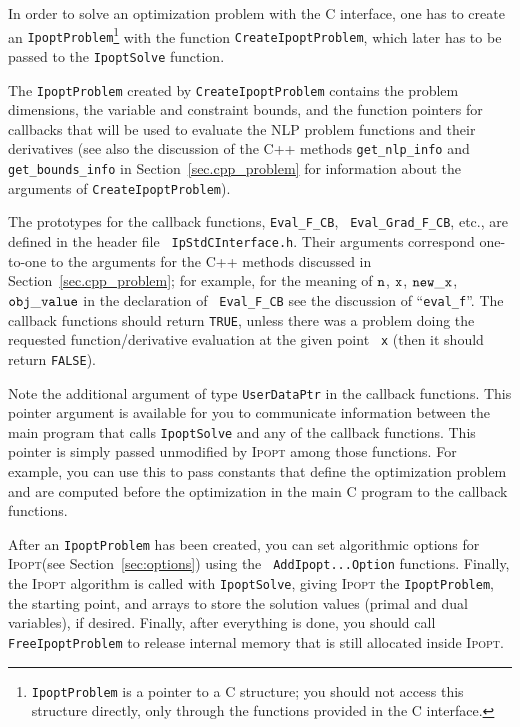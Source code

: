\documentclass[10pt]{article}
\newcommand{\Ipopt}{\textsc{Ipopt}\xspace}
\begin{document}
In order to solve an optimization problem with the C interface, one
has to create an {\tt IpoptProblem}\footnote{{\tt IpoptProblem} is a
  pointer to a C structure; you should not access this structure
  directly, only through the functions provided in the C interface.}
with the function {\tt CreateIpoptProblem}, which later has to be
passed to the {\tt IpoptSolve} function.

The {\tt IpoptProblem} created by {\tt CreateIpoptProblem} contains
the problem dimensions, the variable and constraint bounds, and the
function pointers for callbacks that will be used to evaluate the NLP
problem functions and their derivatives (see also the discussion of
the C++ methods {\tt get\_nlp\_info} and {\tt get\_bounds\_info} in
Section~\ref{sec.cpp_problem} for information about the arguments of
{\tt CreateIpoptProblem}).

The prototypes for the callback functions, {\tt Eval\_F\_CB}, {\tt
  Eval\_Grad\_F\_CB}, etc., are defined in the header file {\tt
  IpStdCInterface.h}.  Their arguments correspond one-to-one to the
arguments for the C++ methods discussed in
Section~\ref{sec.cpp_problem}; for example, for the meaning of $\tt
n$, $\tt x$, $\tt new\_x$, $\tt obj\_value$ in the declaration of {\tt
  Eval\_F\_CB} see the discussion of ``{\tt eval\_f}''.  The callback
functions should return {\tt TRUE}, unless there was a problem doing
the requested function/derivative evaluation at the given point {\tt
  x} (then it should return {\tt FALSE}).

Note the additional argument of type {\tt UserDataPtr} in the callback
functions.  This pointer argument is available for you to communicate
information between the main program that calls {\tt IpoptSolve} and
any of the callback functions.  This pointer is simply passed
unmodified by \Ipopt among those functions.  For example, you can
use this to pass constants that define the optimization problem and
are computed before the optimization in the main C program to the
callback functions.

After an {\tt IpoptProblem} has been created, you can set algorithmic
options for \Ipopt (see Section~\ref{sec:options}) using the {\tt
  AddIpopt...Option} functions.  Finally, the \Ipopt algorithm is
called with {\tt IpoptSolve}, giving \Ipopt the {\tt IpoptProblem},
the starting point, and arrays to store the solution values (primal
and dual variables), if desired.  Finally, after everything is done,
you should call {\tt FreeIpoptProblem} to release internal memory that
is still allocated inside \Ipopt.
\end{document}
